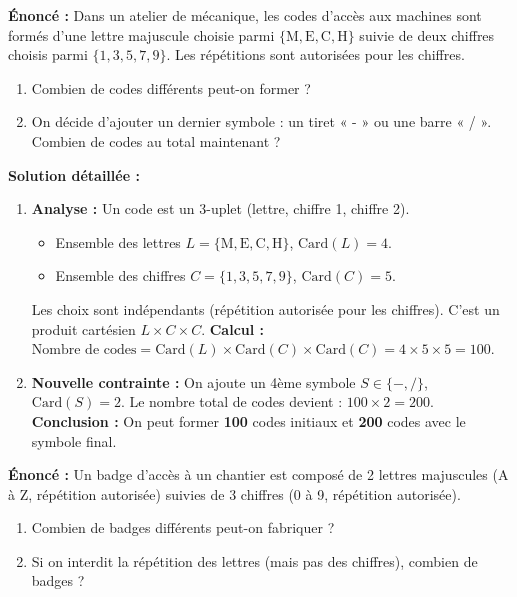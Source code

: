 \documentclass[11pt]{article}
\begin{document}
\begin{exoresolu}
\textbf{Énoncé :} Dans un atelier de mécanique, les codes d'accès aux machines sont formés d'une lettre majuscule choisie parmi $\{\text{M}, \text{E}, \text{C}, \text{H}\}$ suivie de deux chiffres choisis parmi $\{1, 3, 5, 7, 9\}$. Les répétitions sont autorisées pour les chiffres.
\begin{enumerate}
    \item Combien de codes différents peut-on former ?
    \item On décide d'ajouter un dernier symbole : un tiret « - » ou une barre « / ». Combien de codes au total maintenant ?
\end{enumerate}
\tcblower
\textbf{Solution détaillée :}
\begin{enumerate}
    \item \textbf{Analyse :} Un code est un 3-uplet (lettre, chiffre 1, chiffre 2).
    \begin{itemize}
        \item Ensemble des lettres $L = \{\text{M}, \text{E}, \text{C}, \text{H}\}$, $\text{Card}(L) = 4$.
        \item Ensemble des chiffres $C = \{1, 3, 5, 7, 9\}$, $\text{Card}(C) = 5$.
    \end{itemize}
    Les choix sont indépendants (répétition autorisée pour les chiffres). C'est un produit cartésien $L \times C \times C$.
    \textbf{Calcul :} $\text{Nombre de codes} = \text{Card}(L) \times \text{Card}(C) \times \text{Card}(C) = 4 \times 5 \times 5 = 100$.
    \item \textbf{Nouvelle contrainte :} On ajoute un 4ème symbole $S \in \{-, /\}$, $\text{Card}(S) = 2$.
    Le nombre total de codes devient : $100 \times 2 = 200$.
    \textbf{Conclusion :} On peut former \textbf{100} codes initiaux et \textbf{200} codes avec le symbole final.
\end{enumerate}
\end{exoresolu}

\begin{exercice}
\textbf{Énoncé :} Un badge d'accès à un chantier est composé de 2 lettres majuscules (A à Z, répétition autorisée) suivies de 3 chiffres (0 à 9, répétition autorisée).
\begin{enumerate}
    \item Combien de badges différents peut-on fabriquer ?
    \item Si on interdit la répétition des lettres (mais pas des chiffres), combien de badges ?
\end{enumerate}
\end{exercice}
\end{document}
